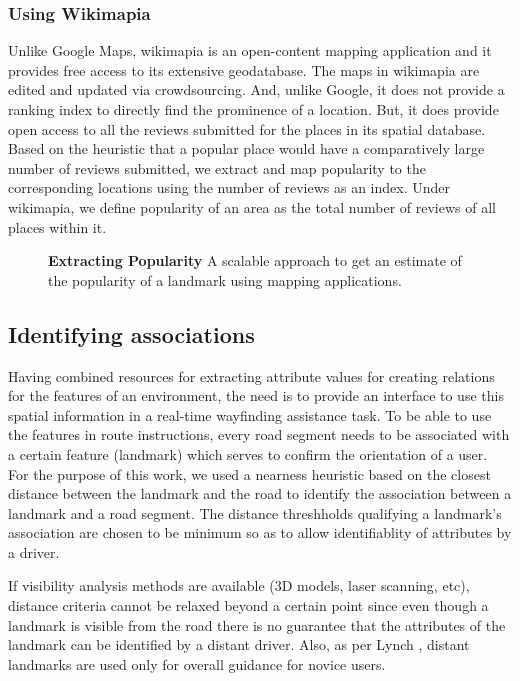 \documentclass{iitkthesis}
\begin{document}
\subsubsection*{Using Wikimapia}
Unlike Google Maps, wikimapia is an open-content mapping application and 
it provides free access to its extensive geodatabase. The maps in 
wikimapia are edited and updated via crowdsourcing. And, unlike 
Google, it does not provide a ranking index to directly find the 
prominence of a location. But, it does provide open access to all the 
reviews submitted for the places in its spatial database. Based on the 
heuristic that a popular place would have a comparatively large number of 
reviews submitted, we extract and map popularity to the corresponding 
locations using the number of reviews as an index. Under wikimapia, we 
define popularity of an area as the total number of reviews of 
all places within it.
\begin{figure}
\centering
{}
\caption{\textbf{\textbf{Extracting Popularity}} A scalable approach to 
get an estimate of the popularity of a landmark using 
mapping applications.}
\label{fig:popular}
 \end{figure}

\subsection{Identifying associations}
Having combined resources for extracting attribute values for creating 
relations for the features of an environment, the need is to provide an 
interface to use this spatial information in a real-time wayfinding 
assistance task. To be able to use the features in route instructions, 
every road segment needs to be associated with a certain feature (landmark) 
which serves to confirm the orientation of a user. For the purpose of 
this work, we used a nearness heuristic based on the closest distance 
between the landmark and the road to identify the association between a 
landmark and a road segment. The distance threshholds qualifying a 
landmark's association are chosen to be minimum so as to allow 
identifiablity of attributes by a driver. 

If visibility analysis methods are available (3D models, laser scanning, 
etc), distance criteria cannot be relaxed beyond a certain point since even
though a landmark is visible from the road there is no guarantee
that the attributes of the landmark can be identified by a 
distant driver. Also, as per Lynch \cite{lynch}, distant landmarks are 
used only for overall guidance for novice users.
\end{document}
